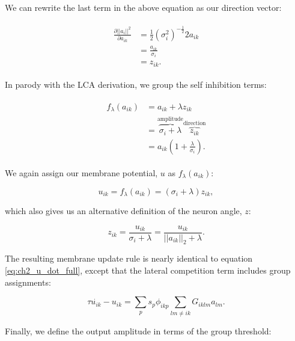 We can rewrite the last term in the above equation as our direction vector:

\begin{align}\label{eq:ch3_subspace_deda_to_z}
\begin{split}
    \frac{\partial ||a_{i}||^{2}}{\partial a_{ik}} &= \frac{1}{2}\left(\sigma_{i}^{2}\right)^{-\tfrac{1}{2}}2a_{ik}\\
    &= \frac{a_{ik}}{\sigma_{i}}\\
    &= z_{ik}.
\end{split}
\end{align}

In parody with the LCA derivation, we group the self inhibition terms:

\begin{align}\label{eq:ch3_f_of_a}
\begin{split}
    f_{\lambda}(a_{ik}) &= a_{ik} + \lambda z_{ik}\\
    &= \overbrace{\sigma_{i}+\lambda}^\text{amplitude}\overbrace{z_{ik}}^\text{direction}\\
    &= a_{ik}(1 + \frac{\lambda}{\sigma_{i}}).
\end{split}
\end{align}

We again assign our membrane potential, $u$ as $f_{\lambda}(a_{ik})$:

\begin{equation}\label{eq:ch3_u_def}
  u_{ik} = f_{\lambda}(a_{ik}) = (\sigma_{i} + \lambda)z_{ik},
\end{equation}

which also gives us an alternative definition of the neuron angle, $z$:

\begin{equation}\label{eq:ch3_z_u_def}
   z_{ik} = \frac{u_{ik}}{\sigma_{i} + \lambda} = \frac{u_{ik}}{||a_{ik}||_{2} + \lambda}.
\end{equation}

The resulting membrane update rule is nearly identical to equation \ref{eq:ch2_u_dot_full}, except that the lateral competition term includes group assignments:

\begin{equation}\label{eq:ch3_subspace_u_dot_def}
   \tau \dot{u_{ik}} - u_{ik} = \sum_{p}s_{p}\phi_{ikp} \sum_{lm \ne ik}G_{iklm}a_{lm}.
\end{equation}

Finally, we define the output amplitude in terms of the group threshold:

